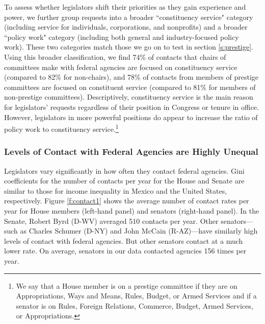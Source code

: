 \documentclass[12pt]{article}
\begin{document}
{To assess whether legislators shift their priorities as they gain experience and power, we further group requests into a broader ``constituency service"  category (including service for individuals, corporations, and nonprofits) and a broader ``policy work" category (including both general and industry-focused policy work). These two categories match those we go on to test in section \ref{s:prestige}. Using this broader classification, we find 74\% of contacts that chairs of committees make with federal agencies are focused on constituency service (compared to 82\% for non-chairs), and 78\% of contacts from members of prestige committees are focused on constituent service (compared to 81\% for members of non-prestige committees). Descriptively, constituency service is the main reason for legislators' requests regardless of their position in Congress or tenure in office. However, legislators in more powerful positions do appear to increase the ratio of policy work to constituency service.\footnote{We say that a House member is on a prestige committee if they are on Appropriations, Ways and Means, Rules, Budget, or Armed Services and if a senator is on Rules, Foreign Relations, Commerce, Budget, Armed Services, or Appropriations.} %


\subsubsection{Levels of Contact with Federal Agencies are Highly Unequal}
Legislators vary significantly in how often they contact federal agencies. Gini coefficients for the number of contacts per year for the House and Senate are similar to those for income inequality in Mexico and the United States, respectively. Figure \ref{f:contact1} shows the average number of contact rates per year for House members (left-hand panel) and senators (right-hand panel). In the Senate, Robert Byrd (D-WV) averaged 510 contacts per year. Other senators---such as Charles Schumer (D-NY) and John McCain (R-AZ)---have similarly high levels of contact with federal agencies. But other senators contact at a much lower rate. On average, senators in our data contacted agencies 156 times per year.   
 
}
\end{document}
